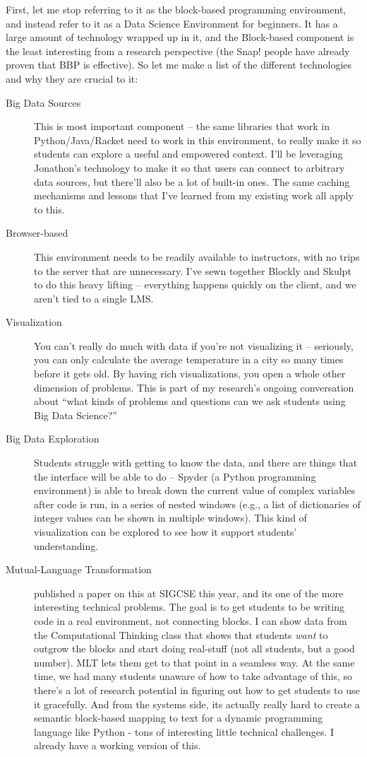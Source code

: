 \documentclass[onecolumn,12pt]{article}
\begin{document}
First, let me stop referring to it as the block-based programming environment, and instead refer to it as a Data Science Environment for beginners.
It has a large amount of technology wrapped up in it, and the Block-based component is the least interesting from a research perspective (the Snap! people have already proven that BBP is effective).
So let me make a list of the different technologies and why they are crucial to it:
\begin{description}
  \item[Big Data Sources] This is most important component -- the same libraries that work in Python/Java/Racket need to work in this environment, to really make it so students can explore a useful and empowered context. I'll be leveraging Jonathon's technology to make it so that users can connect to arbitrary data sources, but there'll also be a lot of built-in ones. The same caching mechanisms and lessons that I've learned from my existing work all apply to this.
	\item[Browser-based] This environment needs to be readily available to instructors, with no trips to the server that are unnecessary. I've sewn together Blockly and Skulpt to do this heavy lifting -- everything happens quickly on the client, and we aren't tied to a single LMS.
	\item[Visualization] You can't really do much with data if you're not visualizing it -- seriously, you can only calculate the average temperature in a city so many times before it gets old. By having rich visualizations, you open a whole other dimension of problems. This is part of my research's ongoing conversation about ``what kinds of problems and questions can we ask students using Big Data Science?''
  \item[Big Data Exploration] Students struggle with getting to know the data, and there are things that the interface will be able to do -- Spyder (a Python programming environment) is able to break down the current value of complex variables after code is run, in a series of nested windows (e.g., a list of dictionaries of integer values can be shown in multiple windows). This kind of visualization can be explored to see how it support students' understanding.
	\item[Mutual-Language Transformation] \cite{Matsuzawa} published a paper on this at SIGCSE this year, and its one of the more interesting technical problems. The goal is to get students to be writing code in a real environment, not connecting blocks. I can show data from the Computational Thinking class that shows that students \textit{want} to outgrow the blocks and start doing real-stuff (not all students, but a good number). MLT lets them get to that point in a seamless way. At the same time, we had many students unaware of how to take advantage of this, so there's a lot of research potential in figuring out how to get students to use it gracefully. And from the systems side, its actually really hard to create a semantic block-based mapping to text for a dynamic programming language like Python - tons of interesting little technical challenges. I already have a working version of this.

\end{description}
\end{document}
